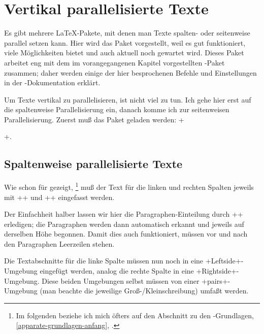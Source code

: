 
\newcommand\reledpar{\mbox{\Package{reledpar}}\xspace}

\section{Vertikal parallelisierte Texte}

\DefineShortVerb{\+}

Es gibt mehrere \LaTeX-Pakete, mit denen man Texte spalten- oder seitenweise parallel setzen kann. Hier wird das Paket \reledpar vorgestellt, weil es gut funktioniert, viele Möglichkeiten bietet und auch aktuell noch gewartet wird. Dieses Paket arbeitet eng mit dem im vorangegangenen Kapitel vorgestellten \reledmac-Paket zusammen; daher werden einige der hier besprochenen Befehle und Einstellungen in der \reledmac-Dokumentation erklärt.

Um Texte vertikal zu parallelisieren, ist nicht viel zu tun. Ich gehe hier erst auf die spaltenweise Parallelisierung ein, danach komme ich zur seitenweisen Parallelisierung. Zuerst muß das Paket geladen werden: +\usepackage{reledpar}+.


\subsection{Spaltenweise parallelisierte Texte}

Wie schon für \reledmac gezeigt,%
\footnote{Im folgenden beziehe ich mich öfters auf den Abschnitt zu den \reledmac-Grundlagen, \cref{apparate-grundlagen-anfang}, .}
muß der Text für die linken und rechten Spalten jeweils mit +\beginnumbering+ und +\endnumbering+ eingefasst werden.%

Der Einfachheit halber lassen wir hier die Paragraphen-Einteilung durch +\autopar+ erledigen;
die Paragraphen werden dann automatisch erkannt und jeweils auf derselben Höhe begonnen. Damit dies auch funktioniert, müssen vor und nach den Paragraphen Leerzeilen stehen.

Die Textabschnitte für die linke Spalte müssen nun noch in eine +Leftside+-Umgebung eingefügt werden, analog die rechte Spalte in eine +Rightside+-Umgebung.
Diese beiden Umgebungen selbst müssen von einer +pairs+-Umgebung (man beachte die jeweilige Groß-/Kleinschreibung) umfaßt werden.

